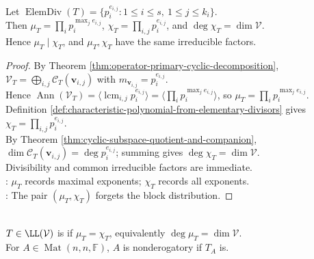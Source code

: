 \begin{theorem} \label{thm:minimal-characteristic-elementary-divisor-relations} \\
Let $\operatorname{ElemDiv}(T)=\{p_i^{e_{i,j}}:1\leq i\leq s,\ 1\leq j\leq k_i\}$.\\
Then $\mu_T=\prod_i p_i^{\max_j e_{i,j}}$, $\chi_T=\prod_{i,j}p_i^{e_{i,j}}$, and $\deg\chi_T=\dim\mathcal{V}$.\\
Hence $\mu_T\mid\chi_T$, and $\mu_T,\chi_T$ have the same irreducible factors.
\begin{proof}
By Theorem \ref{thm:operator-primary-cyclic-decomposition}, $\mathcal{V}_T=\bigoplus_{i,j}\mathcal{C}_T(\mathbf{v}_{i,j})$ with $m_{\mathbf{v}_{i,j}}=p_i^{e_{i,j}}$.\\
Hence $\operatorname{Ann}(\mathcal{V}_T)=\langle\operatorname{lcm}_{i,j}p_i^{e_{i,j}}\rangle=\langle\prod_i p_i^{\max_j e_{i,j}}\rangle$, so $\mu_T=\prod_i p_i^{\max_j e_{i,j}}$. Definition \ref{def:characteristic-polynomial-from-elementary-divisors} gives $\chi_T=\prod_{i,j}p_i^{e_{i,j}}$.\\
By Theorem \ref{thm:cyclic-subspace-quotient-and-companion}, $\dim\mathcal{C}_T(\mathbf{v}_{i,j})=\deg p_i^{e_{i,j}}$; summing gives $\deg\chi_T=\dim\mathcal{V}$.\\
Divisibility and common irreducible factors are immediate.\\
: $\mu_T$ records maximal exponents; $\chi_T$ records all exponents.\\
: The pair $(\mu_T,\chi_T)$ forgets the block distribution.
\end{proof}
\end{theorem}

\begin{definition} \label{def:nonderogatory-operator-module} \\
$T\in\LL(\mathcal{V})$ is  if $\mu_T=\chi_T$, equivalently $\deg\mu_T=\dim\mathcal{V}$.\\
For $A\in\operatorname{Mat}(n,n,\mathbb{F})$, $A$ is nonderogatory if $T_A$ is.
\end{definition}

